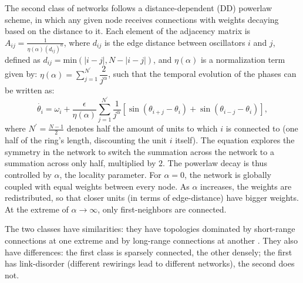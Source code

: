 The second class of networks follows a distance-dependent (DD) powerlaw scheme, in which any given node receives connections with weights decaying based on the distance to it. Each element of the adjacency matrix is $A_{ij} =\frac{1}{\eta(\alpha) (d_{ij})^\alpha}$, where $d_{ij}$ is the edge distance between oscillators $i$ and $j$, defined as $d_{ij} = \mathrm{min}(|i - j|, N - |i - j|)$, and $\eta(\alpha)$ is a normalization term given by: $\eta(\alpha) = \sum\limits_{j=1}^{N^\prime}\dfrac{2}{j^{\alpha}}$, such that the temporal evolution of the phases can be written as:
% 
\begin{equation}
    \Dot{\theta_{i}} = \omega_{i} + \frac{\epsilon}{\eta(\alpha)} \sum\limits_{j=1}^{N^\prime} \frac{1}{j^\alpha} \left[ \sin{(\theta_{i+j} - \theta_{i})} + \sin{(\theta_{i-j} - \theta_{i})} \right],
    \label{eq:main_kuramoto_powerlaw}
\end{equation}
where $N^\prime = \frac{N-1}{2}$ denotes half the amount of units to which $i$ is connected to (one half of the ring's length, discounting the unit $i$ itself). The equation explores the symmetry in the network to switch the summation across the network to a summation across only half, multiplied by $2$.
The powerlaw decay is thus controlled by $\alpha$, the locality parameter. For $\alpha = 0$, the network is globally coupled with equal weights between every node. As $\alpha$ increases, the weights are redistributed, so that closer units (in terms of edge-distance) have bigger weights. At the extreme of $\alpha \to \infty$, only first-neighbors are connected.

The two classes have similarities: they have topologies dominated by short-range connections at one extreme and by long-range connections at another \cite{skardal2020higher, hong2013link}. They also have differences: the first class is sparsely connected, the other densely; the first has link-disorder (different rewirings lead to different networks), the second does not.  

